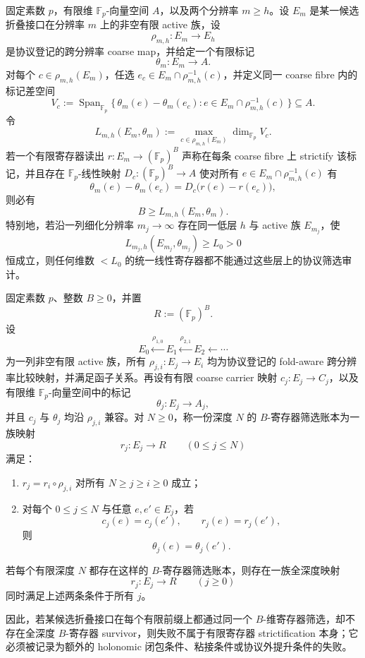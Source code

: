 \begin{proposition}[跨分辨率标记秩的协议筛选下界]\label{prop:distill-gromov-protocol-refinement-stable-mark-rank}
固定素数 \(p\)，有限维 \(\mathbb F_p\)-向量空间 \(A\)，以及两个分辨率 \(m\ge h\)。设 \(E_m\) 是某一候选折叠接口在分辨率 \(m\) 上的非空有限 active 族，设
\[
\rho_{m,h}:E_m\longrightarrow E_h
\]
是协议登记的跨分辨率 coarse map，并给定一个有限标记
\[
\theta_m:E_m\longrightarrow A.
\]
对每个 \(c\in\rho_{m,h}(E_m)\)，任选 \(e_c\in E_m\cap\rho_{m,h}^{-1}(c)\)，并定义同一 coarse fibre 内的标记差空间
\[
V_c:=\operatorname{Span}_{\mathbb F_p}\{\,\theta_m(e)-\theta_m(e_c):e\in E_m\cap\rho_{m,h}^{-1}(c)\,\}\subseteq A.
\]
令
\[
L_{m,h}(E_m,\theta_m):=\max_{c\in\rho_{m,h}(E_m)}\dim_{\mathbb F_p}V_c.
\]
若一个有限寄存器读出 \(r:E_m\to(\mathbb F_p)^B\) 声称在每条 coarse fibre 上 strictify 该标记，并且存在 \(\mathbb F_p\)-线性映射 \(D_c:(\mathbb F_p)^B\to A\) 使对所有 \(e\in E_m\cap\rho_{m,h}^{-1}(c)\) 有
\[
\theta_m(e)-\theta_m(e_c)=D_c\bigl(r(e)-r(e_c)\bigr),
\]
则必有
\[
B\ge L_{m,h}(E_m,\theta_m).
\]
特别地，若沿一列细化分辨率 \(m_j\to\infty\) 存在同一低层 \(h\) 与 active 族 \(E_{m_j}\)，使
\[
L_{m_j,h}(E_{m_j},\theta_{m_j})\ge L_0>0
\]
恒成立，则任何维数 \(<L_0\) 的统一线性寄存器都不能通过这些层上的协议筛选审计。
\end{proposition}

\begin{proposition}[有限寄存器协议筛选的前缀紧性与坏例子定位]\label{distill:gromov-coarse_limit_obstruction_families-protocol-finite-register-prefix-compactness}
固定素数 \(p\)、整数 \(B\ge0\)，并置
\[
R:=(\mathbb F_p)^B.
\]
设
\[
E_0\xleftarrow{\rho_{1,0}}E_1\xleftarrow{\rho_{2,1}}E_2\xleftarrow{}\cdots
\]
为一列非空有限 active 族，所有 \(
\rho_{j,i}:E_j\to E_i
\) 均为协议登记的 fold-aware 跨分辨率比较映射，并满足函子关系。再设有有限 coarse carrier 映射 \(c_j:E_j\to C_j\)，以及有限维 \(\mathbb F_p\)-向量空间中的标记
\[
\theta_j:E_j\longrightarrow A_j,
\]
并且 \(c_j\) 与 \(\theta_j\) 均沿 \(\rho_{j,i}\) 兼容。对 \(N\ge0\)，称一份深度 \(N\) 的 \(B\)-寄存器筛选账本为一族映射
\[
r_j:E_j\longrightarrow R\qquad(0\le j\le N)
\]
满足：
\begin{enumerate}
  \item \(r_j=r_i\circ\rho_{j,i}\) 对所有 \(N\ge j\ge i\ge0\) 成立；
  \item 对每个 \(0\le j\le N\) 与任意 \(e,e'\in E_j\)，若
  \[
  c_j(e)=c_j(e'),\qquad r_j(e)=r_j(e'),
  \]
  则
  \[
  \theta_j(e)=\theta_j(e').
  \]
\end{enumerate}
若每个有限深度 \(N\) 都存在这样的 \(B\)-寄存器筛选账本，则存在一族全深度映射
\[
r_j:E_j\longrightarrow R\qquad(j\ge0)
\]
同时满足上述两条条件于所有 \(j\)。

因此，若某候选折叠接口在每个有限前缀上都通过同一个 \(B\)-维寄存器筛选，却不存在全深度 \(B\)-寄存器 survivor，则失败不属于有限寄存器 strictification 本身；它必须被记录为额外的 holonomic 闭包条件、粘接条件或协议外提升条件的失败。
\end{proposition}

